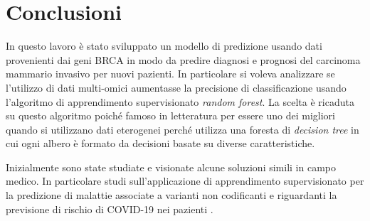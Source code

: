 \documentclass[12pt,italian]{report}
\begin{document}
	\chapter{Conclusioni}
	\label{Conclusioni}
	In questo lavoro è stato sviluppato un modello di predizione usando dati provenienti dai geni BRCA in modo da predire diagnosi e prognosi del carcinoma mammario invasivo per nuovi pazienti. In particolare si voleva analizzare se l'utilizzo di dati multi-omici aumentasse la precisione di classificazione usando l'algoritmo di apprendimento supervisionato \textit{random forest}. La scelta è ricaduta su questo algoritmo poiché famoso in letteratura per essere uno dei migliori quando si utilizzano dati eterogenei perché utilizza una foresta di \textit{decision tree} in cui ogni albero è formato da decisioni basate su diverse caratteristiche.
	
	Inizialmente sono state studiate e visionate alcune soluzioni simili in campo medico. In particolare studi sull'applicazione di apprendimento supervisionato per la predizione di malattie associate a varianti non codificanti e	riguardanti la previsione di rischio di COVID-19 nei pazienti \cite{Schubach2017, Casiraghi2020-zt}.
	
\end{document}
